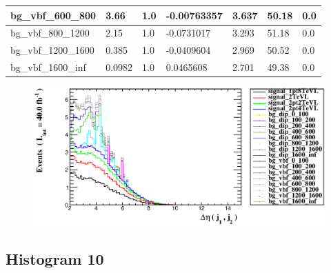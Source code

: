 \documentclass[a4paper, 10pt]{article}
\begin{document}
\begin{table}[H]
\begin{center}
\begin{tabular}{|m{23.0mm}|m{23.0mm}|m{18.0mm}|m{19.0mm}|m{19.0mm}|m{19.0mm}|m{19.0mm}|}
      \hline
      {\cellcolor{white}         bg\_vbf\_600\_800}& {\cellcolor{white}         3.66}& {\cellcolor{white}         1.0}& {\cellcolor{white}         -0.00763357}& {\cellcolor{white}         3.637}& {\cellcolor{red}         50.18}& {\cellcolor{red}         0.0}\\
      \hline
      {\cellcolor{white}         bg\_vbf\_800\_1200}& {\cellcolor{white}         2.15}& {\cellcolor{white}         1.0}& {\cellcolor{white}         -0.0731017}& {\cellcolor{white}         3.293}& {\cellcolor{red}         51.18}& {\cellcolor{red}         0.0}\\
      \hline
      {\cellcolor{white}         bg\_vbf\_1200\_1600}& {\cellcolor{white}         0.385}& {\cellcolor{white}         1.0}& {\cellcolor{white}         -0.0409604}& {\cellcolor{white}         2.969}& {\cellcolor{red}         50.52}& {\cellcolor{red}         0.0}\\
      \hline
      {\cellcolor{white}         bg\_vbf\_1600\_inf}& {\cellcolor{white}         0.0982}& {\cellcolor{white}         1.0}& {\cellcolor{white}         0.0465608}& {\cellcolor{white}         2.701}& {\cellcolor{red}         49.38}& {\cellcolor{red}         0.0}\\
\hline
    \end{tabular}
  \end{center}
\end{table}

\begin{figure}[H]
  \begin{center}
    \includegraphics[scale=0.45]{selection_8.eps}\\
\caption{   }
  \end{center}
\end{figure}
      \newpage
\subsection{ Histogram 10}
\end{document}
